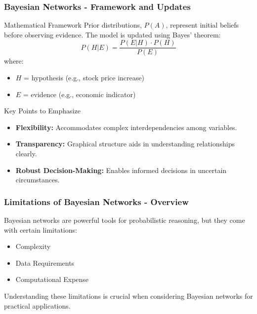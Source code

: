 \documentclass[aspectratio=169]{beamer}
\begin{document}
\begin{frame}[fragile]
    \frametitle{Bayesian Networks - Framework and Updates}
    \begin{block}{Mathematical Framework}
        Prior distributions, \(P(A)\), represent initial beliefs before observing evidence. The model is updated using Bayes' theorem:
        \begin{equation}
            P(H|E) = \frac{P(E|H) \cdot P(H)}{P(E)}
        \end{equation}
        where:
        \begin{itemize}
            \item \(H\) = hypothesis (e.g., stock price increase)
            \item \(E\) = evidence (e.g., economic indicator)
        \end{itemize}
    \end{block}

    \begin{block}{Key Points to Emphasize}
        \begin{itemize}
            \item \textbf{Flexibility:} Accommodates complex interdependencies among variables.
            \item \textbf{Transparency:} Graphical structure aids in understanding relationships clearly.
            \item \textbf{Robust Decision-Making:} Enables informed decisions in uncertain circumstances.
        \end{itemize}
    \end{block}
\end{frame}

\begin{frame}[fragile]
  \frametitle{Limitations of Bayesian Networks - Overview}
  Bayesian networks are powerful tools for probabilistic reasoning, but they come with certain limitations:
  
  \begin{itemize}
    \item Complexity
    \item Data Requirements
    \item Computational Expense
  \end{itemize}
  
  Understanding these limitations is crucial when considering Bayesian networks for practical applications.
\end{frame}
\end{document}
